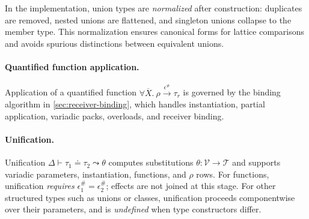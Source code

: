 In the implementation, union types are \emph{normalized} after construction: duplicates are removed, nested unions are flattened, and singleton unions collapse to the member type.  
This normalization ensures canonical forms for lattice comparisons and avoids spurious distinctions between equivalent unions.

\paragraph{Quantified function application.}
Application of a quantified function $\forall\overline{X}.~\rho \xrightarrow{\epsilon^\#} \tau_r$
is governed by the binding algorithm in \autoref{sec:receiver-binding},
which handles instantiation, partial application, variadic packs, overloads, and receiver binding.
\paragraph{Unification.}  
Unification $\Delta \vdash \tau_1 \doteq \tau_2 \leadsto \theta$ computes substitutions $\theta : \mathcal{V} \to \mathcal{T}$ and supports variadic parameters, instantiation, functions, and $\rho$ rows.  
For functions, unification \emph{requires} $\epsilon^\#_1 = \epsilon^\#_2$; effects are not joined at this stage.  
For other structured types such as unions or classes, unification proceeds componentwise over their parameters, and is \emph{undefined} when type constructors differ.

